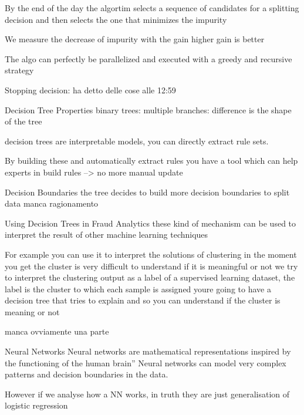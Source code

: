                 By the end of the day the algortim selects a sequence of candidates for a splitting decision and
                then selects the one that minimizes the impurity 

                We measure the decrease of impurity with the gain 
                higher gain is better

                The algo can perfectly be parallelized and executed with a greedy and recursive strategy

            Stopping decision:
                ha detto delle cose alle 12:59

            Decision Tree Properties
                binary trees:
                multiple branches:
                difference is the shape of the tree

                decision trees are interpretable models, you can directly extract rule sets.

                By building these and automatically extract rules you have a tool which can help 
                experts in build rules --> no more manual update

            Decision Boundaries
                the tree decides to build more decision boundaries to split data 
                manca ragionamento

            Using Decision Trees in Fraud Analytics 
                these kind of mechanism can be used to interpret the result of other machine learning techniques

                For example you can use it to interpret the solutions of clustering
                    in the moment you get the cluster is very difficult to understand if it is meaningful or not 
                    we try to interpret the clustering output as a label of a supervised learning dataset, the label is the cluster to which each sample is assigned 
                    youre going to have a decision tree that tries to explain 
                    and so you can understand if the cluster is meaning or not 

                manca ovviamente una parte 
        
    Neural Networks
        Neural networks are mathematical representations
        inspired by the functioning of the human brain”
        Neural networks can model very complex patterns and
        decision boundaries in the data.

        However if we analyse how a NN works, in truth they are just generalisation of logistic regression 

